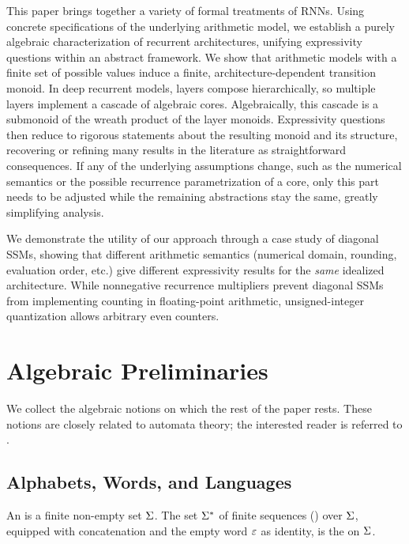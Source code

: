 \documentclass{article}
\begin{document}
This paper brings together a variety of formal treatments of RNNs.
Using concrete specifications of the underlying arithmetic model, we establish a purely algebraic characterization of recurrent architectures, unifying expressivity questions within an abstract framework. 
We show that arithmetic models with a finite set of possible values induce a finite, architecture-dependent transition monoid. 
In deep recurrent models, layers compose hierarchically, so multiple layers implement a cascade of algebraic cores. Algebraically, this cascade is a submonoid of the wreath product of the layer monoids. 
Expressivity questions then reduce to rigorous statements about the resulting monoid and its structure, recovering or refining many results in the literature as straightforward consequences. 
If any of the underlying assumptions change, such as the numerical semantics or the possible recurrence parametrization of a core, only this part needs to be adjusted while the remaining abstractions stay the same, greatly simplifying analysis.

We demonstrate the utility of our approach through a case study of diagonal SSMs, showing that different arithmetic semantics (numerical domain, rounding, evaluation order, etc.) give different expressivity results for the \emph{same} idealized architecture. While nonnegative recurrence multipliers prevent diagonal SSMs from implementing counting in floating-point arithmetic, unsigned-integer quantization allows arbitrary even counters.

\section{Algebraic Preliminaries}\label{sec:algebraic_prelim}
We collect the algebraic notions on which the rest of the paper rests. These notions are closely related to automata theory; the interested reader is referred to \citet{pin2010mathematical}.

\subsection{Alphabets, Words, and Languages}

\begin{definition}
An  is a finite non-empty set $\Sigma$. 
The set $\Sigma^*$ of finite sequences () over $\Sigma$, equipped with concatenation and the empty word $\varepsilon$ as identity, is the  on
$\Sigma$.
\end{definition}
\end{document}
